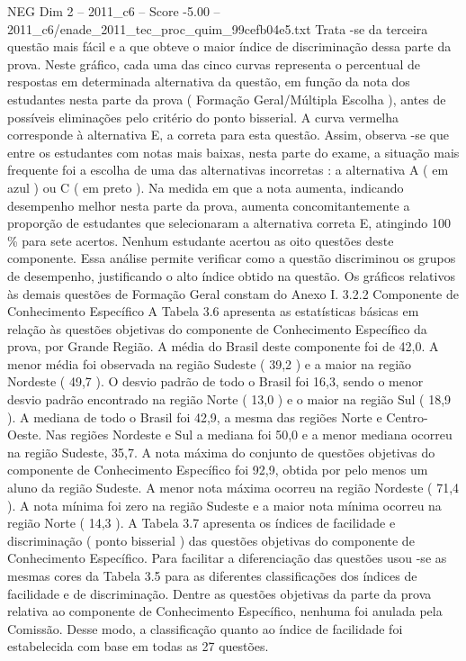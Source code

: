 \begin{textsample}{NEG Dim 2 – 2011\_c6 – Score -5.00 – 2011\_c6/enade\_2011\_tec\_proc\_quim\_99cefb04e5.txt}
Trata -se da terceira questão mais fácil e a que obteve o maior índice de discriminação dessa parte da prova.
Neste gráfico, cada uma das cinco curvas representa o percentual de respostas em determinada alternativa da questão, em função da nota dos estudantes nesta parte da prova ( Formação Geral/Múltipla Escolha ), antes de possíveis eliminações pelo critério do ponto bisserial.
A curva vermelha corresponde à alternativa E, a correta para esta questão.
Assim, observa -se que entre os estudantes com notas mais baixas, nesta parte do exame, a situação mais frequente foi a escolha de uma das alternativas incorretas : a alternativa A ( em azul ) ou C ( em preto ).
Na medida em que a nota aumenta, indicando desempenho melhor nesta parte da prova, aumenta concomitantemente a proporção de estudantes que selecionaram a alternativa correta E, atingindo 100 \% para sete acertos.
Nenhum estudante acertou as oito questões deste componente.
Essa análise permite verificar como a questão discriminou os grupos de desempenho, justificando o alto índice obtido na questão.
Os gráficos relativos às demais questões de Formação Geral constam do Anexo I. 3.2.2 Componente de Conhecimento Específico A Tabela 3.6 apresenta as estatísticas básicas em relação às questões objetivas do componente de Conhecimento Específico da prova, por Grande Região.
A média do Brasil deste componente foi de 42,0.
A menor média foi observada na região Sudeste ( 39,2 ) e a maior na região Nordeste ( 49,7 ).
O desvio padrão de todo o Brasil foi 16,3, sendo o menor desvio padrão encontrado na região Norte ( 13,0 ) e o maior na região Sul ( 18,9 ).
A mediana de todo o Brasil foi 42,9, a mesma das regiões Norte e Centro-Oeste.
Nas regiões Nordeste e Sul a mediana foi 50,0 e a menor mediana ocorreu na região Sudeste, 35,7.
A nota máxima do conjunto de questões objetivas do componente de Conhecimento Específico foi 92,9, obtida por pelo menos um aluno da região Sudeste.
A menor nota máxima ocorreu na região Nordeste ( 71,4 ).
A nota mínima foi zero na região Sudeste e a maior nota mínima ocorreu na região Norte ( 14,3 ).
A Tabela 3.7 apresenta os índices de facilidade e discriminação ( ponto bisserial ) das questões objetivas do componente de Conhecimento Específico.
Para facilitar a diferenciação das questões usou -se as mesmas cores da Tabela 3.5 para as diferentes classificações dos índices de facilidade e de discriminação.
Dentre as questões objetivas da parte da prova relativa ao componente de Conhecimento Específico, nenhuma foi anulada pela Comissão.
Desse modo, a classificação quanto ao índice de facilidade foi estabelecida com base em todas as 27 questões.

\end{textsample}

